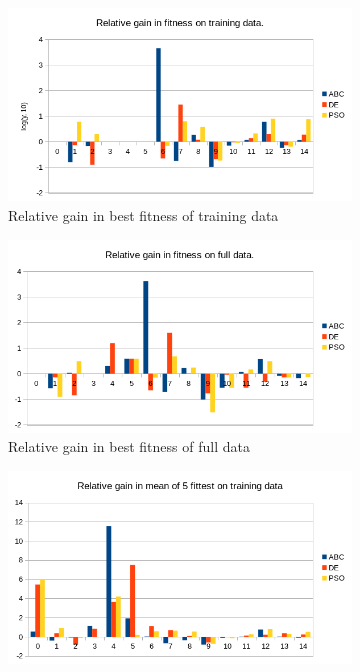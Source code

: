 \begin{figure}
    \centering
    \begin{subfigure}{0.6\textwidth}
    \centering
        \includegraphics[width=0.8\linewidth]{figures/hybrid_phases10_mintrainfitness.png}
        \caption{Relative gain in best fitness of training data}
    \end{subfigure}%
    \begin{subfigure}{0.6\textwidth}
    \centering
        \includegraphics[width=0.8\linewidth]{figures/hybrid_phases10_minfullfitness.png}
        \caption{Relative gain in best fitness of full data}
    \end{subfigure}
        \begin{subfigure}{0.6\textwidth}
    \centering
        \includegraphics[width=0.8\linewidth]{figures/hybrid_phases10_meantrainfitness.png}

\end{subfigure}
\end{figure}
